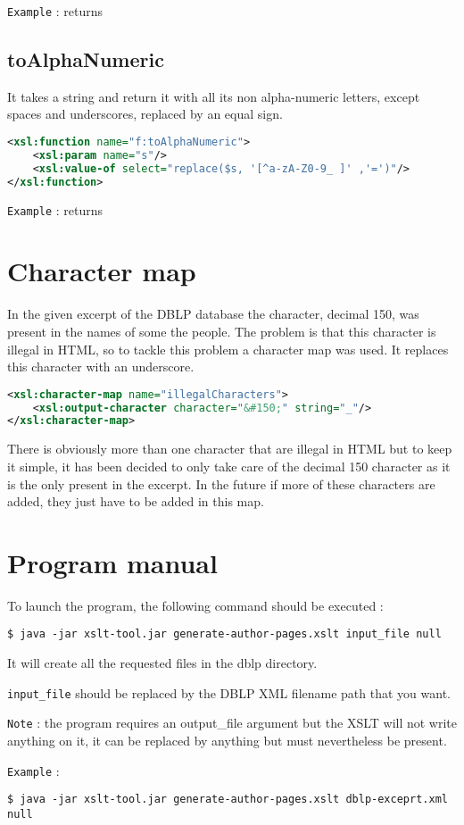 \documentclass{article}[a4]
\begin{document}
\texttt{Example} :  returns 

\subsection{toAlphaNumeric}

It takes a string and return it with all its non alpha-numeric letters, except spaces and underscores, replaced by an equal sign.

\begin{lstlisting}[language=XML]
<xsl:function name="f:toAlphaNumeric">
	<xsl:param name="s"/>
	<xsl:value-of select="replace($s, '[^a-zA-Z0-9_ ]' ,'=')"/>
</xsl:function>
\end{lstlisting}

\texttt{Example} :  returns 

\section{Character map}
In the given excerpt of the DBLP database the character, decimal 150, was present in the names of some the people. The problem is that this character is illegal in HTML, so to tackle this problem a character map was used. It replaces this character with an underscore.

\begin{lstlisting}[language=XML]
<xsl:character-map name="illegalCharacters">
	<xsl:output-character character="&#150;" string="_"/>
</xsl:character-map>
\end{lstlisting}

There is obviously more than one character that are illegal in HTML but to keep it simple, it has been decided to only take care of the decimal 150 character as it is the only present in the excerpt. In the future if more of these characters are added, they just have to be added in this map.

\section{Program manual}

To launch the program, the following command should be executed :
\begin{lstlisting}[frame=lines]
$ java -jar xslt-tool.jar generate-author-pages.xslt input_file null
\end{lstlisting}

It will create all the requested files in the dblp directory.

\texttt{input\_file} should be replaced by the DBLP XML filename path that you want.

\texttt{Note} : the program requires an output\_file argument but the XSLT will not write anything on it, it can be replaced by anything but must nevertheless be present.

\texttt{Example} : 
\begin{lstlisting}[frame=lines]
$ java -jar xslt-tool.jar generate-author-pages.xslt dblp-exceprt.xml null
\end{lstlisting}
\end{document}
